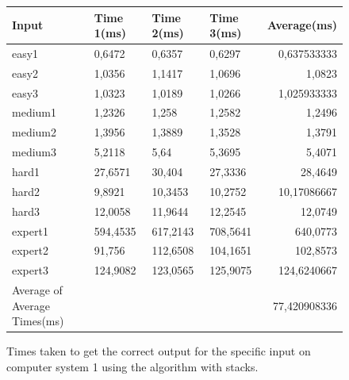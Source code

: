 \documentclass[11pt]{article}
\begin{document}
\begin{figure}[H]
\centering
\begin{tabular}{|l|l|l|l|r|}
\hline
Input & Time 1(ms) & Time 2(ms) & Time 3(ms) & Average(ms)\\
\hline
easy1	& 0,6472  & 0,6357 & 0,6297	& 0,637533333\\
easy2   & 1,0356  & 1,1417 & 1,0696	& 1,0823\\
easy3	& 1,0323  &	1,0189 & 1,0266	& 1,025933333\\
medium1	& 1,2326  &	1,258 &	1,2582	& 1,2496\\
medium2	& 1,3956  &	1,3889 & 1,3528	& 1,3791\\
medium3	& 5,2118  &	5,64 & 5,3695	& 5,4071\\
hard1   & 27,6571 & 30,404 & 27,3336 & 28,4649\\
hard2	& 9,8921  & 10,3453 & 10,2752 & 10,17086667\\
hard3   & 12,0058 & 11,9644 & 12,2545	& 12,0749\\
expert1	& 594,4535 &	617,2143 & 708,5641	& 640,0773\\
expert2	& 91,756 &	112,6508 &	104,1651	& 102,8573\\
expert3	& 124,9082	& 123,0565 &	125,9075  &	124,6240667\\
\hline
Average of Average Times(ms) & & & &77,420908336\\
\hline
\end{tabular}
\caption{Times taken to get the correct output for the specific input on computer system 1 using the algorithm with stacks.}
\end{figure}
\end{document}
